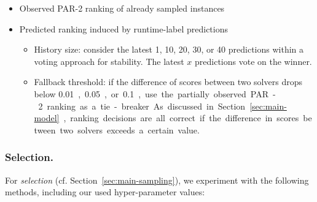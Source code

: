 \documentclass[runningheads]{llncs}
\begin{document}
\begin{itemize}
  \item Observed PAR-2 ranking of already sampled instances
  \item Predicted ranking induced by runtime-label predictions
  \begin{itemize}
    \item
    History size: consider the latest 1, 10, 20, 30, or 40 predictions within a voting approach for stability.
    The latest $x$ predictions vote on the winner.
    \item
    Fallback threshold: if the difference of scores between two solvers drops below \SI{0.01}, \SI{0.05}, or \SI{0.1}, use the partially observed PAR-2 ranking as a tie-breaker.
    As discussed in Section~\ref{sec:main-model}, ranking decisions are all correct if the difference in scores between two solvers exceeds a certain value.
  \end{itemize}
\end{itemize}

\subsubsection{Selection.}

For \emph{selection} (cf. Section~\ref{sec:main-sampling}), we experiment with the following methods, including our used hyper-parameter values:
\end{document}

